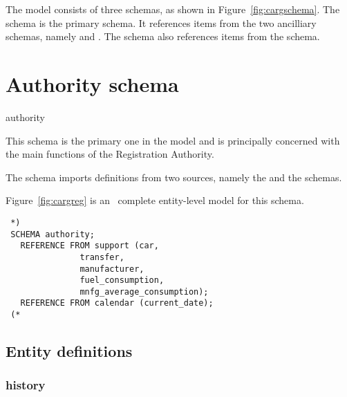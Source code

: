 \documentclass{article}
\providecommand*{\fref}[1]{Figure~\ref{#1}}
\begin{document}
    The model consists of three schemas, as shown in \fref{fig:cargschema}. 
The schema  is the primary schema. It references items from 
the two ancilliary schemas, namely  and . 
The  schema also references items from the  
schema.

\section{Authority schema}

\begin{Mnamedesc}{authority}

\begin{Mdesctext}

This schema is the primary one in the model and is principally concerned
with the main functions of the Registration Authority.

The schema imports definitions from two sources, namely the  
and the  schemas. 

     Figure~\ref{fig:cargreg} is an \ExpressG\ complete entity-level model
 for this schema.

 \end{Mdesctext}

 \begin{Mexp}
 \begin{verbatim}
 *)
 SCHEMA authority;
   REFERENCE FROM support (car,
			   transfer,
			   manufacturer,
			   fuel_consumption,
			   mnfg_average_consumption);
   REFERENCE FROM calendar (current_date);
 (*
 \end{verbatim}
 \end{Mexp}
 \end{Mnamedesc}

 \subsection{Entity definitions}

 \subsubsection{history}
\end{document}
